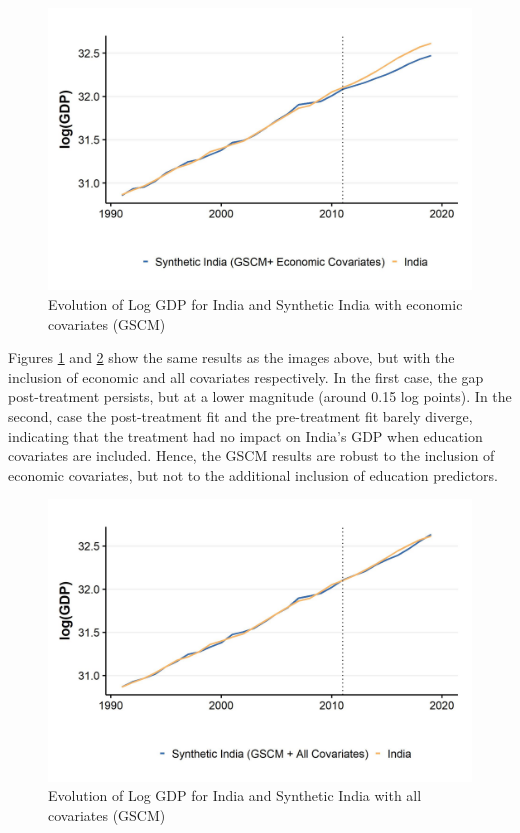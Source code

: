 \documentclass[12pt,nobind, a4paper]{reedthesis}
\begin{document}
 \begin{figure}

 {\centering \includegraphics[width=1\linewidth]{figure/indiagsynthc2} 

 }

 \caption{Evolution of Log GDP for India and Synthetic India with economic covariates (GSCM)}\label{fig:indgsync1}
 \end{figure}
 Figures \ref{fig:indgsync1} and \ref{fig:indgsync2} show the same results as the images above, but with the inclusion of economic and all covariates respectively. In the first case, the gap post-treatment persists, but at a lower magnitude (around 0.15 log points). In the second, case the post-treatment fit and the pre-treatment fit barely diverge, indicating that the treatment had no impact on India's GDP when education covariates are included. Hence, the GSCM results are robust to the inclusion of economic covariates, but not to the additional inclusion of education predictors.
 \newpage
 \begin{figure}

 {\centering \includegraphics[width=1\linewidth]{figure/indiagsynthc1} 

 }

 \caption{Evolution of Log GDP for India and Synthetic India with all covariates (GSCM)}\label{fig:indgsync2}
 \end{figure}
\end{document}
